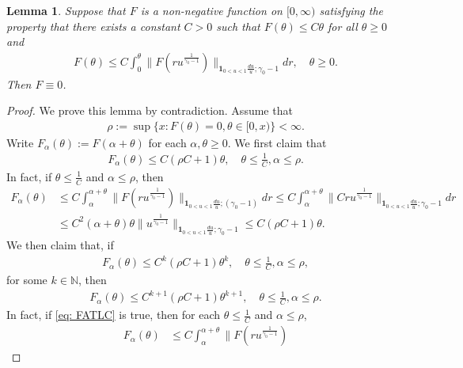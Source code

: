 \documentclass[UTF8]{pkuthss}
\theoremstyle{plain}
\newtheorem{lem}[thm]{Lemma}
\theoremstyle{definition}
\numberwithin{equation}{section}
\begin{document}
\begin{lem}\label{lem: F is zero}
	Suppose that $F$ is a non-negative function on $[0,\infty)$ satisfying the property that there exists a constant $C>0$ such that  $F(\theta) \leq C\theta$ for all $\theta \geq 0$ and
\begin{align}
	F(\theta)
	\leq C \int_0^\theta \|  F(ru^{ \frac{1}{\gamma_0- 1}  })\|_{\mathbf 1_{0<u<1}\frac{du}{u}; \gamma_0 - 1} dr, \quad \theta \geq 0.
\end{align}
	Then $F \equiv 0$.
\end{lem}
	
\begin{proof}
    We prove this lemma by contradiction.
	Assume that
\begin{align}\label{eq: definition of rho}
	\rho :=  \sup\{x: F(\theta) = 0, \theta \in [0,x)\} < \infty.
\end{align}
	Write $F_\alpha (\theta) := F(\alpha + \theta)$ for each $\alpha, \theta \geq 0$.
	We first claim that
\begin{align}
	F_\alpha (\theta)
	\leq C(\rho C + 1) \theta,
	\quad \theta \leq \frac{1}{C}, \alpha \leq \rho.
\end{align}
	In fact, if $\theta \leq \frac{1}{C}$ and $\alpha \leq \rho$, then
\begin{align}
	F_\alpha (\theta)
	&\leq C\int_\alpha^{\alpha + \theta} \|F(ru^{\frac{1}{\gamma_0 - 1}}) \|_{\mathbf 1_{0<u<1}\frac{du}{u}; (\gamma_0 - 1)} dr
	\leq C\int_\alpha^{\alpha + \theta} \|Cru^{\frac{1}{\gamma_0 - 1}} \|_{\mathbf 1_{0<u<1}\frac{du}{u}; \gamma_0 - 1} dr
	\\&\leq C^2 (\alpha + \theta) \theta \|u^{\frac{1}{\gamma_0 - 1}} \|_{\mathbf 1_{0<u<1}\frac{du}{u}; \gamma_0 - 1}
	\leq C(\rho C + 1) \theta.
\end{align}
	We then claim that, if
\begin{align}\label{eq: FATLC}
	F_\alpha (\theta)
	\leq C^k(\rho C + 1) \theta^k,
	\quad \theta \leq \frac{1}{C}, \alpha \leq \rho,
\end{align}
	for some $k \in \mathbb N$, then
\begin{align}
	F_\alpha (\theta)
	\leq C^{k+1}(\rho C + 1) \theta^{k+1},
	\quad \theta \leq \frac{1}{C}, \alpha \leq \rho.
	\end{align}
	In fact, if \eqref{eq: FATLC} is true, then for each $\theta \leq \frac{1}{C}$ and $\alpha \leq \rho$,
\begin{align}
	F_\alpha (\theta)
	&\leq C\int_\alpha^{\alpha + \theta} \|F(ru^{\frac{1}{\gamma_0 - 1}})

\end{align}
\end{proof}
\end{document}
